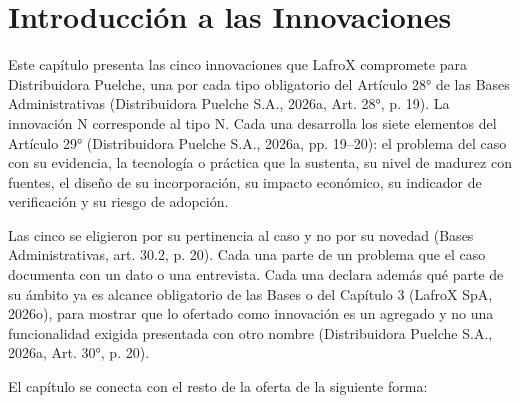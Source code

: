 
\chapter{Introducción a las Innovaciones}
\label{cap:sd13}

Este capítulo presenta las cinco innovaciones que LafroX compromete para Distribuidora Puelche, una por cada tipo obligatorio del Artículo 28° de las Bases Administrativas (Distribuidora Puelche S.A., 2026a, Art. 28°, p. 19). La innovación N corresponde al tipo N. Cada una desarrolla los siete elementos del Artículo 29° (Distribuidora Puelche S.A., 2026a, pp. 19–20): el problema del caso con su evidencia, la tecnología o práctica que la sustenta, su nivel de madurez con fuentes, el diseño de su incorporación, su impacto económico, su indicador de verificación y su riesgo de adopción.

Las cinco se eligieron por su pertinencia al caso y no por su novedad (Bases Administrativas, art. 30.2, p. 20). Cada una parte de un problema que el caso documenta con un dato o una entrevista. Cada una declara además qué parte de su ámbito ya es alcance obligatorio de las Bases o del Capítulo 3 (LafroX SpA, 2026o), para mostrar que lo ofertado como innovación es un agregado y no una funcionalidad exigida presentada con otro nombre (Distribuidora Puelche S.A., 2026a, Art. 30°, p. 20).

El capítulo se conecta con el resto de la oferta de la siguiente forma:

